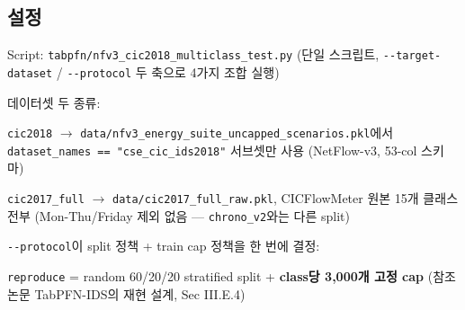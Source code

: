 \subsection{설정}
\par\noindent \textbullet\enspace Script: \texttt{tabpfn/\allowbreak{}\allowbreak{}n\allowbreak{}fv3\_\allowbreak{}\allowbreak{}cic2\allowbreak{}018\_\allowbreak{}\allowbreak{}mult\allowbreak{}iclass\_\allowbreak{}\allowbreak{}t\allowbreak{}est.\allowbreak{}py} (단일 스크립트, \texttt{-\allowbreak{}-\allowbreak{}target\allowbreak{}-\allowbreak{}dataset\allowbreak{}} /\allowbreak{} \texttt{-\allowbreak{}-\allowbreak{}protoc\allowbreak{}ol} 두 축으로 4가지 조합 실행)


\par\noindent \textbullet\enspace 데이터셋 두 종류:

\par\noindent \textbullet\enspace \texttt{cic2018}  \ensuremath{\rightarrow}  \texttt{data/\allowbreak{}\allowbreak{}nfv\allowbreak{}3\_\allowbreak{}\allowbreak{}energy\allowbreak{}\_\allowbreak{}\allowbreak{}suite\_\allowbreak{}\allowbreak{}u\allowbreak{}ncapped\_\allowbreak{}\allowbreak{}scenario\allowbreak{}s.\allowbreak{}pkl}에서 \texttt{dataset\_\allowbreak{}\allowbreak{}names =\allowbreak{}\allowbreak{}=\allowbreak{}\allowbreak{} "cse\_\allowbreak{}\allowbreak{}ci\allowbreak{}c\_\allowbreak{}\allowbreak{}ids201\allowbreak{}8"} 서브셋만 사용 (NetFlow-v3, 53-col 스키마)


\par\noindent \textbullet\enspace \texttt{cic2017\_\allowbreak{}\allowbreak{}full}  \ensuremath{\rightarrow}  \texttt{data/\allowbreak{}\allowbreak{}cic\allowbreak{}2017\_\allowbreak{}\allowbreak{}ful\allowbreak{}l\_\allowbreak{}\allowbreak{}raw.\allowbreak{}pk\allowbreak{}l}, CICFlowMeter 원본 15개 클래스 전부 (Mon-Thu/\allowbreak{}Friday 제외 없음 — \texttt{chrono\_\allowbreak{}\allowbreak{}v\allowbreak{}2}와는 다른 split)



\par\noindent \textbullet\enspace \texttt{-\allowbreak{}-\allowbreak{}protoc\allowbreak{}ol}이 split 정책 +\allowbreak{} train cap 정책을 한 번에 결정:

\par\noindent \textbullet\enspace \texttt{reproduc\allowbreak{}e} =\allowbreak{} random 60/\allowbreak{}20/\allowbreak{}20 stratified split +\allowbreak{} \textbf{class당 3,000개 고정 cap} (참조 논문 TabPFN-IDS의 재현 설계, Sec III.E.4)


